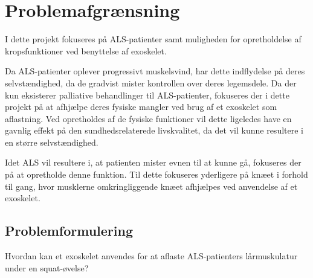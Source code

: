 \section{Problemafgrænsning}
I dette projekt fokuseres på ALS-patienter samt muligheden for opretholdelse af kropsfunktioner ved benyttelse af exoskelet. 

Da ALS-patienter oplever progressivt muskelsvind, har dette indflydelse på deres selvstændighed, da de gradvist mister kontrollen over deres legemsdele. Da der kun eksisterer palliative behandlinger til ALS-patienter, fokuseres der i dette projekt på at afhjælpe deres fysiske mangler ved brug af et exoskelet som aflastning.
Ved opretholdes af de fysiske funktioner vil dette ligeledes have en gavnlig effekt på den sundhedsrelaterede livskvalitet, da det vil kunne resultere i en større selvstændighed.%

Idet ALS vil resultere i, at patienten mister evnen til at kunne gå, fokuseres der på at opretholde denne funktion. Til dette fokuseres yderligere på knæet i forhold til gang, hvor musklerne omkringliggende knæet afhjælpes ved anvendelse af et exoskelet.

\subsection{Problemformulering}
Hvordan kan et exoskelet anvendes for at aflaste ALS-patienters lårmuskulatur under en squat-øvelse?